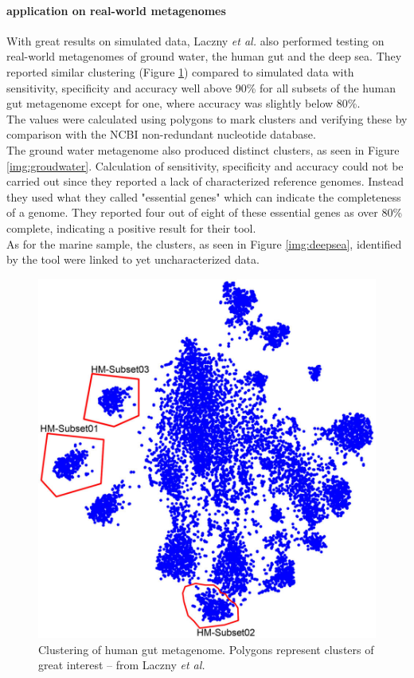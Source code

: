 \documentclass[twocolumn]{bmcart}%
\begin{document}
\paragraph*{application on real-world metagenomes}
With great results on simulated data, Laczny \textit{et al.} also performed testing on real-world metagenomes of ground water\cite{Wrighton1661}, the human gut \cite{Arumugam2011} and the deep sea\cite{Konstantinidis15082009}. They reported similar clustering (Figure \ref{img:humangut}) compared to simulated data with sensitivity, specificity and accuracy well above 90\% for all subsets of the human gut metagenome except for one, where accuracy was slightly below 80\%.\\
The values were calculated using polygons to mark clusters and verifying these by comparison with the NCBI non-redundant nucleotide database.\\
The ground water metagenome also produced distinct clusters, as seen in Figure \ref{img:groudwater}. Calculation of sensitivity, specificity and accuracy could not be carried out since they reported a lack of characterized reference genomes. Instead they used what they called "essential genes" which can indicate the completeness of a genome. They reported four out of eight of these essential genes as over 80\% complete, indicating a positive result for their tool.\\
As for the marine sample, the clusters, as seen in Figure \ref{img:deepsea}, identified by the tool were linked to yet  uncharacterized data.
	\begin{figure}
		\includegraphics[width=.9\linewidth]{bilder/humangutCluster.jpg}
		\caption{Clustering of human gut metagenome. Polygons represent clusters of great interest -- from Laczny \textit{et al.}\cite{Laczny2014}}
\label{img:humangut}	
\end{figure}
\end{document}
